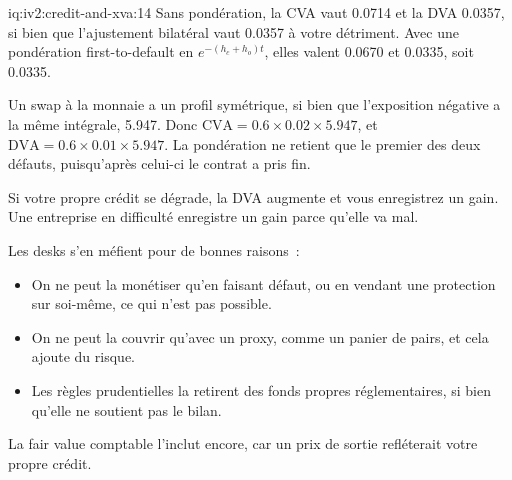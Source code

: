\begin{solution}{iq:iv2:credit-and-xva:14}
Sans pondération, la CVA vaut 0.0714 et la DVA 0.0357, si bien que l'ajustement bilatéral vaut 0.0357 à votre détriment. Avec une pondération first-to-default en $e^{-(h_c + h_o)t}$, elles valent 0.0670 et 0.0335, soit 0.0335.

Un swap à la monnaie a un profil symétrique, si bien que l'exposition négative a la même intégrale, 5.947. Donc $\mathrm{CVA} = 0.6 \times 0.02 \times 5.947$, et $\mathrm{DVA} = 0.6 \times 0.01 \times 5.947$. La pondération ne retient que le premier des deux défauts, puisqu'après celui-ci le contrat a pris fin.

Si votre propre crédit se dégrade, la DVA augmente et vous enregistrez un gain. Une entreprise en difficulté enregistre un gain parce qu'elle va mal.

Les desks s'en méfient pour de bonnes raisons~:
\begin{itemize}
\item On ne peut la monétiser qu'en faisant défaut, ou en vendant une protection sur soi-même, ce qui n'est pas possible.
\item On ne peut la couvrir qu'avec un proxy, comme un panier de pairs, et cela ajoute du risque.
\item Les règles prudentielles la retirent des fonds propres réglementaires, si bien qu'elle ne soutient pas le bilan.
\end{itemize}

La fair value comptable l'inclut encore, car un prix de sortie refléterait votre propre crédit.

\end{solution}

